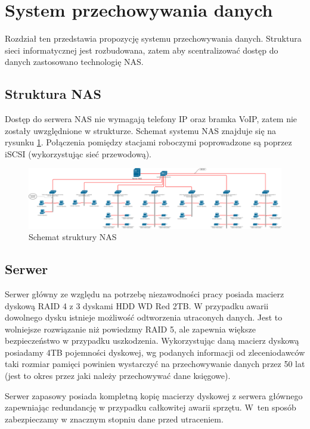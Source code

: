 \newpage
\section{System przechowywania \newline danych}
Rozdział ten przedstawia propozycję systemu przechowywania danych. Struktura sieci informatycznej jest rozbudowana, zatem aby scentralizować dostęp do danych zastosowano technologię NAS.

\subsection{Struktura NAS}
Dostęp do serwera NAS nie wymagają telefony IP oraz bramka VoIP, zatem nie zostały uwzględnione w strukturze. Schemat systemu NAS znajduje się na rysunku \ref{schemat:schemat_sieci_NAS}. Połączenia pomiędzy stacjami roboczymi poprowadzone są poprzez iSCSI (wykorzystując sieć przewodową).
\begin{landscape}
	\hspace{4cm}
	\begin{figure}[!h]
		\includegraphics[width=24cm]{Schemat_NAS.png}
		\caption{Schemat struktury NAS}
		\label{schemat:schemat_sieci_NAS}
	\end{figure}
\end{landscape}

\subsection{Serwer}
Serwer główny ze względu na potrzebę niezawodności pracy posiada macierz dyskową RAID 4 z 3 dyskami HDD WD Red 2TB. W przypadku awarii dowolnego dysku istnieje możliwość odtworzenia utraconych danych. Jest to wolniejsze rozwiązanie niż powiedzmy RAID 5, ale zapewnia większe bezpieczeństwo w przypadku uszkodzenia. Wykorzystując daną macierz dyskową posiadamy 4TB pojemności dyskowej, wg podanych informacji od zleceniodawców taki rozmiar pamięci powinien wystarczyć na przechowywanie danych przez 50 lat (jest to okres przez jaki należy przechowywać dane księgowe).

Serwer zapasowy posiada kompletną kopię macierzy dyskowej z serwera głównego zapewniając redundancję w przypadku całkowitej awarii sprzętu. W~ten sposób zabezpieczamy w znacznym stopniu dane przed utraceniem.


